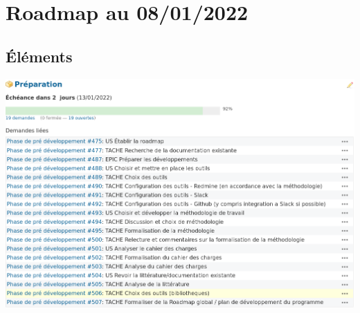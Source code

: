 \section{Roadmap au 08/01/2022}

\subsection{Éléments}

\noindent%
\includegraphics[scale=0.5]{images/prepa.png}

